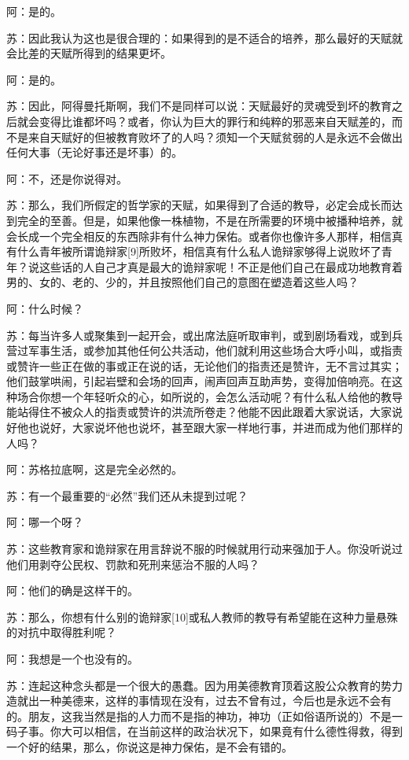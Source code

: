 \documentclass[12pt,oneside]{book}
\begin{document}
阿：是的。

苏：因此我认为这也是很合理的：如果得到的是不适合的培养，那么最好的天赋就会比差的天赋所得到的结果更坏。

阿：是的。

苏：因此，阿得曼托斯啊，我们不是同样可以说：天赋最好的灵魂受到坏的教育之后就会变得比谁都坏吗？或者，你认为巨大的罪行和纯粹的邪恶来自天赋差的，而不是来自天赋好的但被教育败坏了的人吗？须知一个天赋贫弱的人是永远不会做出任何大事（无论好事还是坏事）的。

阿：不，还是你说得对。

苏：那么，我们所假定的哲学家的天赋，如果得到了合适的教导，必定会成长而达到完全的至善。但是，如果他像一株植物，不是在所需要的环境中被播种培养，就会长成一个完全相反的东西除非有什么神力保佑。或者你也像许多人那样，相信真有什么青年被所谓诡辩家[9]所败坏，相信真有什么私人诡辩家够得上说败坏了青年？说这些话的人自己才真是最大的诡辩家呢！不正是他们自己在最成功地教育着男的、女的、老的、少的，并且按照他们自己的意图在塑造着这些人吗？

阿：什么时候？

苏：每当许多人或聚集到一起开会，或出席法庭听取审判，或到剧场看戏，或到兵营过军事生活，或参加其他任何公共活动，他们就利用这些场合大呼小叫，或指责或赞许一些正在做的事或正在说的话，无论他们的指责还是赞许，无不言过其实；他们鼓掌哄闹，引起岩壁和会场的回声，闹声回声互助声势，变得加倍响亮。在这种场合你想一个年轻听众的心，如所说的，会怎么活动呢？有什么私人给他的教导能站得住不被众人的指责或赞许的洪流所卷走？他能不因此跟着大家说话，大家说好他也说好，大家说坏他也说坏，甚至跟大家一样地行事，并进而成为他们那样的人吗？

阿：苏格拉底啊，这是完全必然的。

苏：有一个最重要的“必然”我们还从未提到过呢？

阿：哪一个呀？

苏：这些教育家和诡辩家在用言辞说不服的时候就用行动来强加于人。你没听说过他们用剥夺公民权、罚款和死刑来惩治不服的人吗？

阿：他们的确是这样干的。

苏：那么，你想有什么别的诡辩家[10]或私人教师的教导有希望能在这种力量悬殊的对抗中取得胜利呢？

阿：我想是一个也没有的。

苏：连起这种念头都是一个很大的愚蠢。因为用美德教育顶着这股公众教育的势力造就出一种美德来，这样的事情现在没有，过去不曾有过，今后也是永远不会有的。朋友，这我当然是指的人力而不是指的神功，神功（正如俗语所说的）不是一码子事。你大可以相信，在当前这样的政治状况下，如果竟有什么德性得救，得到一个好的结果，那么，你说这是神力保佑，是不会有错的。
\end{document}
